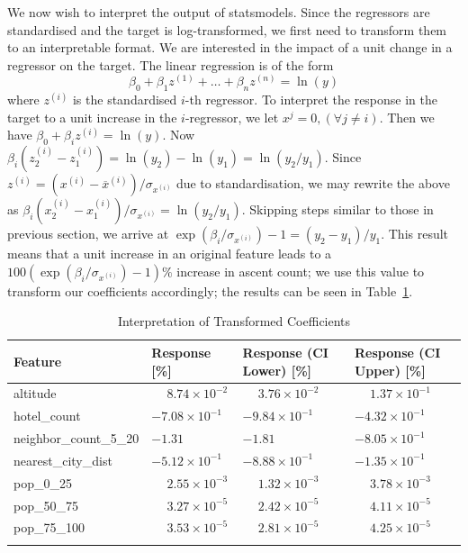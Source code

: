 \documentclass[11pt,a4paper]{article}
\begin{document}
We now wish to interpret the output of statsmodels. Since the regressors are standardised and the target is log-transformed, we first need to transform them to an interpretable format. We are interested in the impact of a unit change in a regressor on the target. The linear regression is of the form 
$$\beta_0+\beta_1z^{(1)}+ \dots + \beta_n z^{(n)}=\ln(y)$$ 
where $z^{(i)}$ is the standardised $i$-th regressor. To interpret the response in the target to a unit increase in the $i$-regressor, we let $x^j = 0, (\forall j \neq i)$. Then we have $\beta_0 + \beta_i z^{(i)} = \ln(y)$. Now $\beta_i (z_2^{(i)} - z_1^{(i)}) = \ln(y_2) - \ln(y_1)=\ln(y_2/y_1)$. Since 
$z^{(i)} = (x^{(i)} - \overline{x}^{(i)})/\sigma_{x^{(i)}}$
due to standardisation, we may rewrite the above as $\beta_i (x_2^{(i)} - x_1^{(i)})/\sigma_{x^{(i)}} =\ln(y_2/y_1)$. Skipping steps similar to those in previous section, we arrive at $\exp(\beta_i / \sigma_{x^{(i)}}) - 1 = (y_2 - y_1) / y_1$. This result means that a unit increase in an original feature leads to a $100\left(\exp(\beta_i / \sigma_{x^{(i)}}) - 1\right)\%$ increase in ascent count; we use this value to transform our coefficients accordingly; the results can be seen in Table~\ref{table:2}.
\begin{table} [h!]
\centering
\caption{Interpretation of Transformed Coefficients}
\begin{tabular}{l l l l}
\toprule
    Feature & 
    Response [\%] & 
    Response (CI Lower) [\%] & 
    Response (CI Upper) [\%] \\
\midrule
altitude & $\phantom{-}8.74 \times 10^{-2}$ & $\phantom{-}3.76\times 10^{-2}$ & $\phantom{-}1.37\times 10^{-1}$ \\
hotel\_count & $-7.08\times 10^{-1}$ & $-9.84\times 10^{-1}$ & $-4.32\times 10^{-1}$ \\
neighbor\_count\_5\_20 & $-1.31$ & $-1.81$ & $-8.05\times 10^{-1}$ \\
nearest\_city\_dist & $-5.12\times 10^{-1}$ & $-8.88\times 10^{-1}$ & $-1.35\times 10^{-1}$ \\
pop\_0\_25 & $\phantom{-}2.55 \times 10^{-3}$ & $\phantom{-}1.32\times 10^{-3}$ & $\phantom{-}3.78\times 10^{-3}$ \\
pop\_50\_75 & $\phantom{-}3.27 \times 10^{-5}$ & $\phantom{-}2.42\times 10^{-5}$ &  $\phantom{-}4.11\times 10^{-5}$ \\
pop\_75\_100 & $\phantom{-}3.53 \times 10^{-5}$ & $\phantom{-}2.81\times 10^{-5}$ &  $\phantom{-}4.25\times 10^{-5}$\\
\bottomrule
\label{table:2}
\end{tabular}
\end{table}
\end{document}
